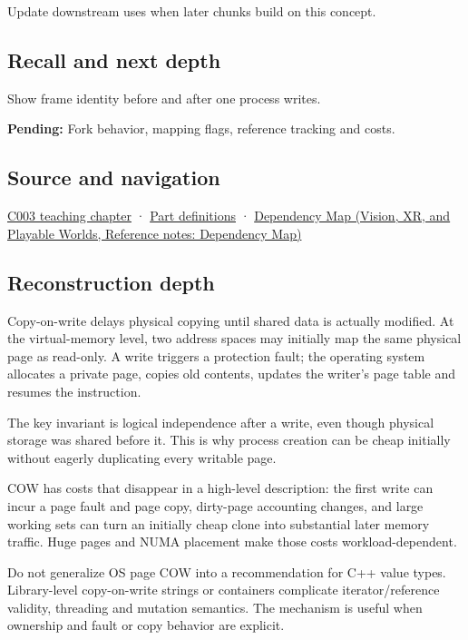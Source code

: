 Update downstream uses when later chunks build on this concept.

\subsection{Recall and next depth}\label{appendix-7a06e5baac04-recall-and-next-depth}

\hypertarget{appendix-7a06e5baac04-recall-and-next-depth}{}

Show frame identity before and after one process writes.

\textbf{Pending:} Fork behavior, mapping flags, reference tracking and costs.

\subsection{Source and navigation}\label{appendix-7a06e5baac04-source-and-navigation}

\hypertarget{appendix-7a06e5baac04-source-and-navigation}{}

\hyperref[01-foundations-i-ch002-where-the-bytes-live]{C003 teaching chapter} · \hyperref[appendix-fd090d982a15-m003---parts-41-60]{Part definitions} · \href{../07-Vision-XR-and-Playable-Worlds/main.pdf\#nameddest=appendix-4ad47bdd269a}{Dependency Map (Vision, XR, and Playable Worlds, Reference notes: Dependency Map)}

\subsection{Reconstruction depth}\label{appendix-7a06e5baac04-reconstruction-depth}

\hypertarget{appendix-7a06e5baac04-reconstruction-depth}{}

Copy-on-write delays physical copying until shared data is actually modified. At the virtual-memory level, two address spaces may initially map the same physical page as read-only. A write triggers a protection fault; the operating system allocates a private page, copies old contents, updates the writer's page table and resumes the instruction.

The key invariant is logical independence after a write, even though physical storage was shared before it. This is why process creation can be cheap initially without eagerly duplicating every writable page.

COW has costs that disappear in a high-level description: the first write can incur a page fault and page copy, dirty-page accounting changes, and large working sets can turn an initially cheap clone into substantial later memory traffic. Huge pages and NUMA placement make those costs workload-dependent.

Do not generalize OS page COW into a recommendation for C++ value types. Library-level copy-on-write strings or containers complicate iterator/reference validity, threading and mutation semantics. The mechanism is useful when ownership and fault or copy behavior are explicit.
